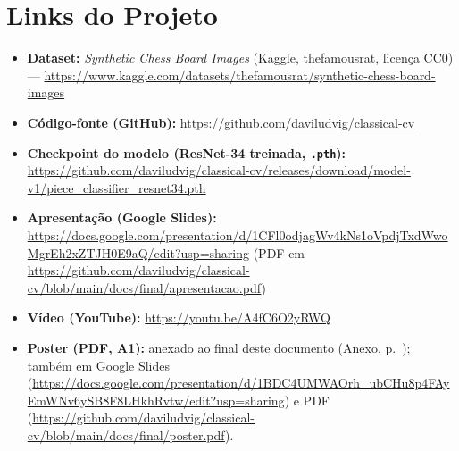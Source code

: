 \section{Links do Projeto}
\label{sec:links}

\begin{itemize}
  \item \textbf{Dataset:} \textit{Synthetic Chess Board Images} (Kaggle, thefamousrat,
        licença CC0) --- \url{https://www.kaggle.com/datasets/thefamousrat/synthetic-chess-board-images}
  \item \textbf{Código-fonte (GitHub):} \url{https://github.com/daviludvig/classical-cv}
  \item \textbf{Checkpoint do modelo (ResNet-34 treinada, \texttt{.pth}):}
        \url{https://github.com/daviludvig/classical-cv/releases/download/model-v1/piece_classifier_resnet34.pth}
  \item \textbf{Apresentação (Google Slides):}
        \url{https://docs.google.com/presentation/d/1CFl0odjagWv4kNs1oVpdjTxdWwoMgrEh2xZTJH0E9aQ/edit?usp=sharing}
        (PDF em
        \url{https://github.com/daviludvig/classical-cv/blob/main/docs/final/apresentacao.pdf})
  \item \textbf{Vídeo (YouTube):} \url{https://youtu.be/A4fC6O2yRWQ}
  \item \textbf{Poster (PDF, A1):} anexado ao final deste documento (Anexo, p.~\pageref{sec:poster});
        também em Google Slides
        (\url{https://docs.google.com/presentation/d/1BDC4UMWAOrh_ubCHu8p4FAyEmWNv6ySB8F8LHkhRvtw/edit?usp=sharing})
        e PDF (\url{https://github.com/daviludvig/classical-cv/blob/main/docs/final/poster.pdf}).
\end{itemize}

